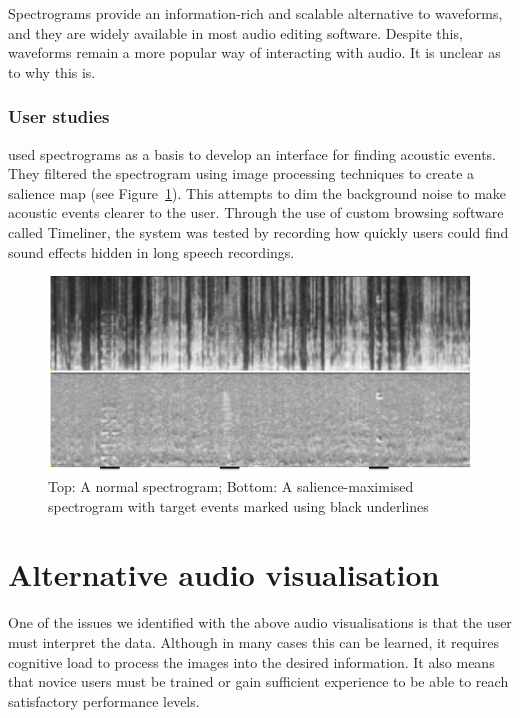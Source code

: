 Spectrograms provide an information-rich and scalable alternative to waveforms, and they are widely available in most
audio editing software. Despite this, waveforms remain a more popular way of interacting with audio. It is unclear as
to why this is.

\subsubsection{User studies}

\citet{Goudeseune2012} used spectrograms as a basis to develop an interface for finding acoustic events.  They filtered
the spectrogram using image processing techniques to create a salience map (see Figure~\ref{fig:timeliner}). This
attempts to dim the background noise to make acoustic events clearer to the user.  Through the use of custom browsing
software called Timeliner, the system was tested by recording how quickly users could find sound effects hidden in long
speech recordings.

\begin{figure}[ht]
  \centering
  \includegraphics[width=0.95\linewidth]{figs/spectrogram-salience.png}
  \caption{Top: A normal spectrogram; Bottom: A salience-maximised spectrogram with target events marked using black
    underlines}
  \label{fig:timeliner}
\end{figure}

\section{Alternative audio visualisation}\label{sec:background-alternative}

One of the issues we identified with the above audio visualisations is that the user must interpret the data. Although
in many cases this can be learned, it requires cognitive load to process the images into the desired information. It
also means that novice users must be trained or gain sufficient experience to be able to reach satisfactory performance
levels.

